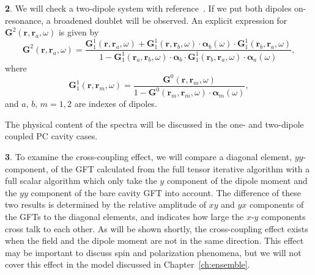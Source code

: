 {\textbf 2.} We will check a two-dipole system with reference~\cite{Yao2009c}. If we put both dipoles on-resonance, a broadened doublet will be observed. An explicit expression for $\mathbf{G}^2(\mathbf{r},\mathbf{r}_a,\omega)$ is given by~\cite{Yao2009c}
\begin{equation}
 \label{G2}
\mathbf{G}^2(\mathbf{r},\mathbf{r}_a,\omega)=\frac{\mathbf{G}_1^1(\mathbf{r},\mathbf{r}_a,\omega)+\mathbf{G}^1_1(\mathbf{r},\mathbf{r}_b,\omega)\cdot \boldsymbol{\alpha}_b(\omega)\cdot \mathbf{G}^1_1(\mathbf{r}_b,\mathbf{r}_a,\omega)}{1-\mathbf{G}^1_1(\mathbf{r}_a,\mathbf{r}_b,\omega)\cdot \boldsymbol{\alpha}_b \cdot \mathbf{G}^1_1(\mathbf{r}_b,\mathbf{r}_a,\omega)\cdot \boldsymbol{\alpha}_a(\omega)},
\end{equation}
where
\begin{equation}
 \label{tildeG}
\mathbf{G}^1_1(\mathbf{r},\mathbf{r}_m,\omega)=\frac{\mathbf{G}^0(\mathbf{r},\mathbf{r}_m,\omega)}{1-\mathbf{G}^0(\mathbf{r}_m,\mathbf{r}_m,\omega)\cdot \boldsymbol{\alpha}_m(\omega)},
\end{equation}
and $a,\, b, \, m=1,2$ are indexes of dipoles.

The physical content of the spectra will be discussed in the one- and two-dipole coupled PC cavity cases.

{\textbf 3.} To examine the cross-coupling effect, we will compare a diagonal element, $yy$-component, of the GFT calculated from the full tensor iterative algorithm with a full scalar algorithm which only take the $y$ component of the dipole moment and the $yy$ component of the bare cavity GFT into account. The difference of these two results is determined by the relative amplitude of $xy$ and $yx$ components of the GFTs to the diagonal elements, and indicates how large the $x$-$y$ components cross talk to each other. As will be shown shortly, the cross-coupling effect exists when the field and the dipole moment are not in the same direction. This effect may be important to discuss spin and polarization phenomena, but we will not cover this effect in the model discussed in Chapter~\ref{ch:ensemble}.


